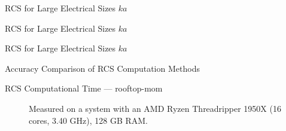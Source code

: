 \documentclass[t, aspectratio=169, 10pt]{beamer}
\begin{document}
\begin{frame}{RCS for Large Electrical Sizes $ka$}
    \begin{figure}[ht]
        \centering
        
    \end{figure}
\end{frame}

\begin{frame}{RCS for Large Electrical Sizes $ka$}
    \begin{figure}[ht]
        \centering
        
    \end{figure}
\end{frame}

\begin{frame}{RCS for Large Electrical Sizes $ka$}
    \begin{figure}[ht]
        \centering
        
    \end{figure}
\end{frame}

\begin{frame}{Accuracy Comparison of RCS Computation Methods}
    \begin{figure}[ht]
        \centering
        
    \end{figure}
\end{frame}

\begin{frame}{RCS Computational Time --- rooftop-mom}
    \begin{figure}[ht]
        \centering
        
        \caption{Measured on a system with an AMD Ryzen Threadripper 1950X (16 cores, 3.40 GHz), 128 GB RAM.}
    \end{figure}
\end{frame}
\end{document}
